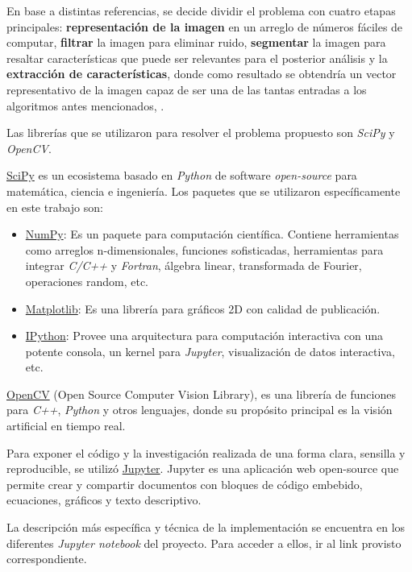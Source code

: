 \documentclass[10pt,a4paper]{article}
\begin{document}
En base a distintas referencias, se decide dividir el problema con cuatro etapas principales: \textbf{representación de la imagen} en un arreglo de números fáciles de computar, \textbf{filtrar} la imagen para eliminar ruido, \textbf{segmentar} la imagen para resaltar características que puede ser relevantes para el posterior análisis y la \textbf{extracción de características}, donde como resultado se obtendría un vector representativo de la imagen capaz de ser una de las tantas entradas a los algoritmos antes mencionados, \textcite{SciPy2018}.

Las librerías que se utilizaron para resolver el problema propuesto son \textit{SciPy} y \textit{OpenCV}.

\href{https://www.scipy.org/}{SciPy} es un ecosistema basado en \textit{Python} de software \textit{open-source} para matemática, ciencia e ingeniería. Los paquetes que se utilizaron específicamente en este trabajo son:

\begin{itemize}
\item \href{http://www.numpy.org/}{NumPy}: Es un paquete para computación científica. Contiene herramientas como arreglos n-dimensionales, funciones sofisticadas, herramientas para integrar \textit{C/C++} y \textit{Fortran}, álgebra linear, transformada de Fourier, operaciones random, etc.

\item \href{https://matplotlib.org/}{Matplotlib}: Es una librería para gráficos 2D con calidad de publicación.

\item \href{https://ipython.org/}{IPython}: Provee una arquitectura para computación interactiva con una potente consola, un kernel para \textit{Jupyter}, visualización de datos interactiva, etc.
\end{itemize}

\href{https://opencv.org/}{OpenCV} (Open Source Computer Vision Library), es una librería de funciones para \textit{C++}, \textit{Python} y otros lenguajes, donde su propósito principal es la visión artificial en tiempo real.

Para exponer el código y la investigación realizada de una forma clara, sensilla y reproducible, se utilizó \href{https://jupyter.org/}{Jupyter}. Jupyter es una aplicación web open-source que permite crear y compartir documentos con bloques de código embebido, ecuaciones, gráficos y texto descriptivo.

La descripción más específica y técnica de la implementación se encuentra en los diferentes \textit{Jupyter notebook} del proyecto. Para acceder a ellos, ir al link provisto correspondiente.
\end{document}
